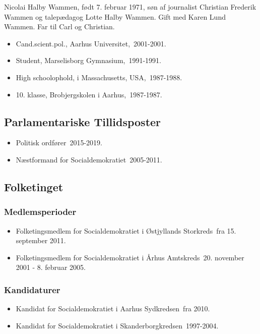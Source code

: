 \documentclass[11pt, a4paper]{awesome-cv}
\begin{document}
\makecvheader[R]
\makelettertitle
\begin{cvletter}
Nicolai Halby Wammen, født 7. februar 1971, søn af journalist Christian Frederik Wammen og talepædagog Lotte Halby Wammen. Gift med Karen Lund Wammen. Far til Carl og Christian.

\begin{itemize}
\item Cand.scient.pol., Aarhus Universitet, 2001-2001.
\item Student, Marselisborg Gymnasium, 1991-1991.
\item High schoolophold, i Massachusetts, USA, 1987-1988.
\item 10. klasse, Brobjergskolen i Aarhus, 1987-1987.
\end{itemize}
\subsection*{Parlamentariske Tillidsposter}
\begin{itemize}
\item Politisk ordfører 2015-2019.
\item Næstformand for Socialdemokratiet 2005-2011.
\end{itemize}
\subsection*{Folketinget}
\subsubsection*{Medlemsperioder}
\begin{itemize}
\item Folketingsmedlem for Socialdemokratiet i Østjyllands Storkreds fra 15. september 2011.
\item Folketingsmedlem for Socialdemokratiet i Århus Amtskreds 20. november 2001 - 8. februar 2005.
\end{itemize}
\subsubsection*{Kandidaturer}
\begin{itemize}
\item Kandidat for Socialdemokratiet i Aarhus Sydkredsen fra 2010.
\item Kandidat for Socialdemokratiet i Skanderborgkredsen 1997-2004.
\end{itemize}
\end{cvletter}
\end{document}
